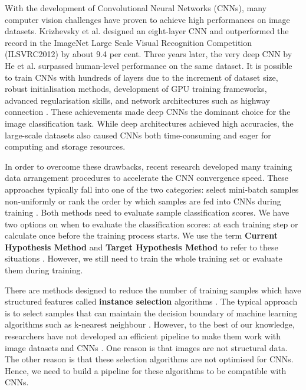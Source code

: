 With the development of Convolutional Neural Networks (CNNs), many computer vision challenges have proven to achieve high performances on image datasets. Krizhevsky et al. \cite{Krizhevsky2017} designed an eight-layer CNN and outperformed the record in the ImageNet Large Scale Visual Recognition Competition (ILSVRC2012) by about 9.4 per cent. Three years later, the very deep CNN by He et al. \cite{He, He2016} surpassed human-level performance on the same dataset. It is possible to train CNNs with hundreds of layers due to the increment of dataset size, robust initialisation methods, development of GPU training frameworks, advanced regularisation skills, and network architectures such as highway connection \cite{He2016, Huang2017}. These achievements made deep CNNs the dominant choice for the image classification task. While deep architectures achieved high accuracies, the large-scale datasets also caused CNNs both time-consuming and eager for computing and storage resources. 

In order to overcome these drawbacks, recent research developed many training data arrangement procedures to accelerate the CNN convergence speed. These approaches typically fall into one of the two categories: select mini-batch samples non-uniformly \cite{Shrivastava2016, Li2017, Katharopoulos2017, Chang2017} or rank the order by which samples are fed into CNNs during training \cite{Bengio2009, Hacohen2019a}. Both methods need to evaluate sample classification scores. We have two options on when to evaluate the classification scores: at each training step or calculate once before the training process starts. We use the term \textbf{Current Hypothesis Method} and \textbf{Target Hypothesis Method} to refer to these situations \cite{Hacohen2019a}. However, we still need to train the whole training set or evaluate them during training. 

There are methods designed to reduce the number of training samples which have structured features called \textbf{instance selection} algorithms \cite{Olvera-Lopez2010, Aha1991, Brighton2002, Riquelme2003a}. The typical approach is to select samples that can maintain the decision boundary of machine learning algorithms such as k-nearest neighbour \cite{Malhat2020}. However, to the best of our knowledge, researchers have not developed an efficient pipeline to make them work with image datasets and CNNs \cite{Sun2014, Albelwi2016, Birodkar2019}. One reason is that images are not structural data. The other reason is that these selection algorithms are not optimised for CNNs. Hence, we need to build a pipeline for these algorithms to be compatible with CNNs.


